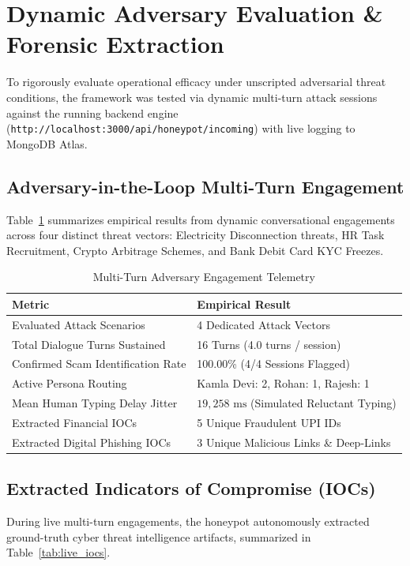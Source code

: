 \documentclass[conference]{IEEEtran}
\begin{document}
\section{Dynamic Adversary Evaluation \& Forensic Extraction}
To rigorously evaluate operational efficacy under unscripted adversarial threat conditions, the framework was tested via dynamic multi-turn attack sessions against the running backend engine (\texttt{http://localhost:3000/api/honeypot/incoming}) with live logging to MongoDB Atlas.

\subsection{Adversary-in-the-Loop Multi-Turn Engagement}
Table~\ref{tab:live_metrics} summarizes empirical results from dynamic conversational engagements across four distinct threat vectors: Electricity Disconnection threats, HR Task Recruitment, Crypto Arbitrage Schemes, and Bank Debit Card KYC Freezes.

\begin{table}[h]
\caption{Multi-Turn Adversary Engagement Telemetry}
\label{tab:live_metrics}
\centering
\begin{tabular}{ll}
\toprule
\textbf{Metric} & \textbf{Empirical Result} \\
\midrule
Evaluated Attack Scenarios & 4 Dedicated Attack Vectors \\
Total Dialogue Turns Sustained & 16 Turns (4.0 turns / session) \\
Confirmed Scam Identification Rate & 100.00\% (4/4 Sessions Flagged) \\
Active Persona Routing & Kamla Devi: 2, Rohan: 1, Rajesh: 1 \\
Mean Human Typing Delay Jitter & $19,258\text{ ms}$ (Simulated Reluctant Typing) \\
Extracted Financial IOCs & 5 Unique Fraudulent UPI IDs \\
Extracted Digital Phishing IOCs & 3 Unique Malicious Links \& Deep-Links \\
\bottomrule
\end{tabular}
\end{table}

\subsection{Extracted Indicators of Compromise (IOCs)}
During live multi-turn engagements, the honeypot autonomously extracted ground-truth cyber threat intelligence artifacts, summarized in Table~\ref{tab:live_iocs}.
\end{document}
